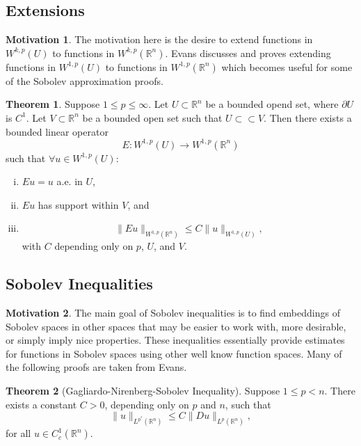 \documentclass[11pt]{article}
\theoremstyle{definition}
\newtheorem*{theorem}{Theorem}
\newtheorem*{motivation}{Motivation}
\begin{document}
\newpage

\subsection{Extensions}
\begin{motivation}
The motivation here is the desire to extend functions in $W^{k,p}(U)$ to functions in $W^{k,p}(\mathbb{R}^n)$.
Evans discusses and proves extending functions in $W^{1,p}(U)$ to functions in $W^{1,p}(\mathbb{R}^n)$ which becomes
useful for some of the Sobolev approximation proofs.
\end{motivation}

\begin{theorem}
	Suppose $1 \leq p \leq \infty$.
Let $U \subset \mathbb{R}^n$ be a bounded opend set, where $\partial U$ is $C^1$.
Let $V \subset \mathbb{R}^n$ be a bounded open set such that $U \subset\subset V$.
Then there exists a bounded linear operator
	\[E: W^{1,p}(U) \rightarrow W^{1,p}(\mathbb{R}^n)\]
such that $\forall u \in W^{1,p}(U)$:
	\begin{enumerate}[(i)]
		\item $Eu = u$ a.e. in $U$,
		\item $Eu$ has support within $V$, and
		\item \[\|Eu\|_{W^{1,p}(\mathbb{R}^n)} \leq C\|u\|_{W^{1,p}(U)},\]
		with $C$ depending only on $p$, $U$, and $V$.
	\end{enumerate}
\end{theorem}


\newpage

\subsection{Sobolev Inequalities}
\begin{motivation}
The main goal of Sobolev inequalities is to find embeddings of Sobolev spaces in other spaces that may be easier to work with, more desirable,
or simply imply nice properties. These inequalities essentially provide estimates for functions in Sobolev spaces using other
well know function spaces. Many of the following proofs are taken from Evans.
\end{motivation}
\begin{theorem}[Gagliardo-Nirenberg-Sobolev Inequality]
Suppose $1\leq p < n$. There exists a constant $C > 0$, depending only on $p$ and $n$, such that
	\[\|u\|_{L^{p^*}(\mathbb{R}^n)} \leq C\|Du\|_{L^{p}(\mathbb{R}^n)},\]
for all $u \in C_{c}^{1}(\mathbb{R}^n)$.
\end{theorem}
\end{document}
